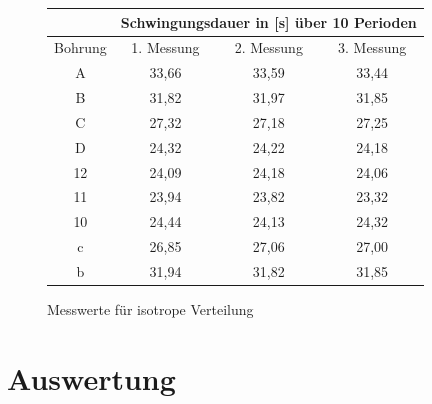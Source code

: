 \documentclass[fontsize=12pt]{scrartcl}
\begin{document}
\begin{figure}[h!]
\vspace{-10pt}
\centering
\caption{Messwerte für isotrope Verteilung}
\begin{tabular}{|c|c|c|c|} \hline
 &\multicolumn{3}{|c|}{Schwingungsdauer in [s] über 10 Perioden}\\ \hline
Bohrung &1. Messung	&2. Messung	&3. Messung\\ \hline
A		&33,66&	33,59	&33,44 \\ \hline
B		&31,82&	31,97	&31,85\\ \hline
C		&27,32&	27,18	&27,25\\ \hline
D		&24,32&	24,22	&24,18\\ \hline
12	&24,09&	24,18	&24,06\\ \hline
11		&23,94&	23,82	&23,32\\ \hline
10	&24,44&	24,13	&24,32\\ \hline
 c		&26,85&	27,06	&27,00\\ \hline
 b		&31,94&	31,82	&31,85\\ \hline
\end{tabular}
\end{figure}
\newpage

\section{ Auswertung}
\end{document}
